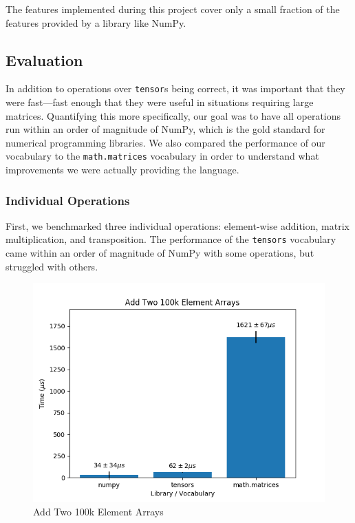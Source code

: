 \documentclass[
]{article}
\begin{document}
The features implemented during this project cover only a small fraction
of the features provided by a library like NumPy.

\hypertarget{evaluation}{%
\subsection{Evaluation}\label{evaluation}}

In addition to operations over \texttt{tensor}s being correct, it was
important that they were fast---fast enough that they were useful in
situations requiring large matrices. Quantifying this more specifically,
our goal was to have all operations run within an order of magnitude of
NumPy, which is the gold standard for numerical programming libraries.
We also compared the performance of our vocabulary to the
\texttt{math.matrices} vocabulary in order to understand what
improvements we were actually providing the language.

\hypertarget{individual-operations}{%
\subsubsection{Individual Operations}\label{individual-operations}}

First, we benchmarked three individual operations: element-wise
addition, matrix multiplication, and transposition. The performance of
the \texttt{tensors} vocabulary came within an order of magnitude of
NumPy with some operations, but struggled with others. 

\begin{figure}
\centering
\includegraphics{add.png}
\caption{Add Two 100k Element Arrays}
\end{figure}
\end{document}

